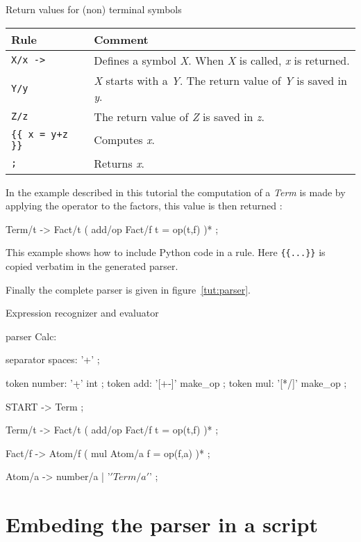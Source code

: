 \begin{tableau}
\caption{Return values for (non) terminal symbols} \label{tut:ret_val}
\begin{tabular}{| l | p{9cm} |}
\hline
	Rule & Comment \\
\hline
	\verb!X/x ->!			& Defines a symbol \emph{X}. When \emph{X} is called, \emph{x} is returned. \\
	\verb!Y/y!				& \emph{X} starts with a \emph{Y}. The return value of \emph{Y} is saved in \emph{y}. \\
	\verb!Z/z!				& The return value of \emph{Z} is saved in \emph{z}. \\
	\verb!{{ x = y+z }}!	& Computes \emph{x}. \\
	\verb!;!				& Returns \emph{x}. \\
\hline
\end{tabular}
\end{tableau}

In the example described in this tutorial the computation of a \emph{Term} is made by applying the operator to the factors, this value is then returned :

\begin{verbatimtab}[4]
	Term/t -> Fact/t ( add/op Fact/f {{ t = op(t,f) }} )* ;
\end{verbatimtab}

This example shows how to include Python code in a rule. Here \verb!{{...}}! is copied verbatim in the generated parser.

Finally the complete parser is given in figure~\ref{tut:parser}.

\begin{code}
\caption{Expression recognizer and evaluator} \label{tut:parser}
\begin{verbatimtab}[4]
parser Calc:

	separator spaces: '\s+' ;

	token number: '\d+' int ;
	token add: '[+-]' make_op ;
	token mul: '[*/]' make_op ;

	START -> Term ;

	Term/t -> Fact/t ( add/op Fact/f {{ t = op(t,f) }} )* ;

	Fact/f -> Atom/f ( mul Atom/a {{ f = op(f,a) }} )* ;

	Atom/a -> number/a | '\(' Term/a '\)' ;
\end{verbatimtab}
\end{code}

\section{Embeding the parser in a script}

